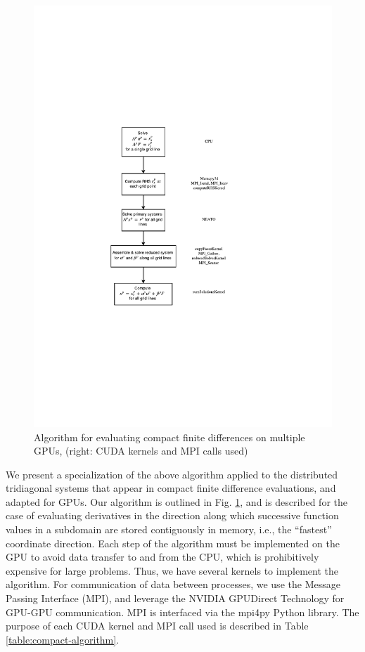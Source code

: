 \documentclass{elsarticle}
\begin{document}
\begin{figure}
\begin{center}
\includegraphics[trim={0cm 8cm 0cm 8cm},clip,width=500pt]{img/compact-algorithm.pdf}
\centering
\caption{Algorithm for evaluating compact finite differences on multiple GPUs,
(right: CUDA kernels and MPI calls used)}
\label{fig:compact-algorithm}
\end{center}
\end{figure}

We present a specialization of the above algorithm
applied to the distributed tridiagonal systems that
appear in compact finite difference evaluations,
and adapted for GPUs.
Our algorithm is outlined in Fig. \ref{fig:compact-algorithm},
and is described for the case of evaluating derivatives
in the direction along which successive
function values in a subdomain are stored contiguously in memory,
i.e., the ``fastest'' coordinate direction.
Each step of the algorithm must be implemented on the GPU
to avoid data transfer to and from the CPU,
which is prohibitively expensive for large problems.
Thus, we have several kernels to implement the algorithm.
For communication of data between processes,
we use the Message Passing Interface (MPI),
and leverage the NVIDIA GPUDirect Technology
for GPU-GPU communication.
MPI is interfaced via the mpi4py \cite{dalcin2005mpi}
Python library.
The purpose of each CUDA kernel and MPI call used
is described in Table \ref{table:compact-algorithm}.
\end{document}
